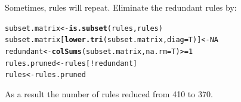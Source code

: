 \documentclass{article}\usepackage[]{graphicx}\usepackage[]{color}
\makeatletter
\newcommand{\hlnum}[1]{\textcolor[rgb]{0.686,0.059,0.569}{#1}}%
\newcommand{\hlopt}[1]{\textcolor[rgb]{0,0,0}{#1}}%
\newcommand{\hlstd}[1]{\textcolor[rgb]{0.345,0.345,0.345}{#1}}%
\newcommand{\hlkwb}[1]{\textcolor[rgb]{0.69,0.353,0.396}{#1}}%
\newcommand{\hlkwc}[1]{\textcolor[rgb]{0.333,0.667,0.333}{#1}}%
\newcommand{\hlkwd}[1]{\textcolor[rgb]{0.737,0.353,0.396}{\textbf{#1}}}%
\newenvironment{kframe}{%
 \def\at@end@of@kframe{}%
 \ifinner\ifhmode%
  \def\at@end@of@kframe{\end{minipage}}%
  \begin{minipage}{\columnwidth}%
 \fi\fi%
 \def\FrameCommand##1{\hskip\@totalleftmargin \hskip-\fboxsep
 \colorbox{shadecolor}{##1}\hskip-\fboxsep
     \hskip-\linewidth \hskip-\@totalleftmargin \hskip\columnwidth}%
 \MakeFramed {\advance\hsize-\width
   \@totalleftmargin\z@ \linewidth\hsize
   \@setminipage}}%
 {\par\unskip\endMakeFramed%
 \at@end@of@kframe}
\newenvironment{knitrout}{}{} %
\makeatother
\begin{document}
Sometimes, rules will repeat. Eliminate the redundant rules by:
\begin{knitrout}
\color{fgcolor}\begin{kframe}
\begin{alltt}
\hlstd{subset.matrix} \hlkwb{<-} \hlkwd{is.subset}\hlstd{(rules, rules)}
\hlstd{subset.matrix[}\hlkwd{lower.tri}\hlstd{(subset.matrix,} \hlkwc{diag}\hlstd{=T)]} \hlkwb{<-} \hlnum{NA}
\hlstd{redundant} \hlkwb{<-} \hlkwd{colSums}\hlstd{(subset.matrix,} \hlkwc{na.rm}\hlstd{=T)} \hlopt{>=} \hlnum{1}
\hlstd{rules.pruned} \hlkwb{<-} \hlstd{rules[}\hlopt{!}\hlstd{redundant]}
\hlstd{rules}\hlkwb{<-}\hlstd{rules.pruned}
\end{alltt}
\end{kframe}
\end{knitrout}
As a result the number of rules reduced from 410 to 370. 
\end{document}
